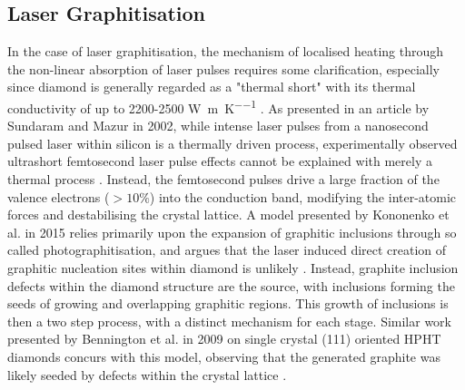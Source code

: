 \begin{refsection}
\subsection{Laser Graphitisation}
In the case of laser graphitisation, the mechanism of localised heating through the non-linear absorption of laser pulses requires some clarification, especially since diamond is generally regarded as a "thermal short" with its thermal conductivity of up to 2200-2500 \si{\watt\per\metre\per\kelvin} \cite{graebner:1995}. As presented in an article by Sundaram and Mazur in 2002, while intense laser pulses from a nanosecond pulsed laser within silicon is a thermally driven process, experimentally observed ultrashort femtosecond laser pulse effects cannot be explained with merely a thermal process \cite{sundaram:2002}. Instead, the femtosecond pulses drive a large fraction of the valence electrons ($>10\%$) into the conduction band, modifying the inter-atomic forces and destabilising the crystal lattice. A model presented by Kononenko et al. in 2015 relies primarily upon the expansion of graphitic inclusions through so called photographitisation, and argues that the laser induced direct creation of graphitic nucleation sites within diamond is unlikely \cite{kononenko:2015}. Instead, graphite inclusion defects within the diamond structure are the source, with inclusions forming the seeds of growing and overlapping graphitic regions. This growth of inclusions is then a two step process, with a distinct mechanism for each stage. Similar work presented by Bennington et al. in 2009 on single crystal (111) oriented HPHT diamonds concurs with this model, observing that the generated graphite was likely seeded by defects within the crystal lattice \cite{bennington:2009}.


\end{refsection}
